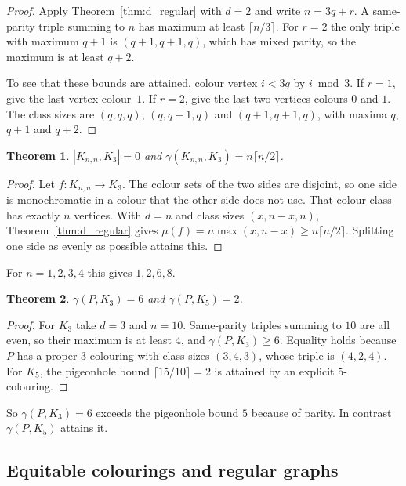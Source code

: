 \documentclass{article}
\newtheorem{theorem}{Theorem}[section]
\theoremstyle{definition}
\begin{document}
\begin{proof}
Apply Theorem~\ref{thm:d_regular} with $d=2$ and write $n=3q+r$.  A same-parity
triple summing to $n$ has maximum at least $\lceil n/3\rceil$.  For $r=2$ the
only triple with maximum $q+1$ is $(q+1,q+1,q)$, which has mixed parity, so the
maximum is at least $q+2$.

To see that these bounds are attained, colour vertex $i<3q$ by $i\bmod3$.  If
$r=1$, give the last vertex colour~$1$.  If $r=2$, give the last two vertices
colours $0$ and $1$.  The class sizes are $(q,q,q)$, $(q,q+1,q)$ and
$(q+1,q+1,q)$, with maxima $q$, $q+1$ and $q+2$.
\end{proof}

\begin{theorem}
\label{thm:Knn}
$|K_{n,n},K_3|=0$ and $\gamma(K_{n,n},K_3)=n\lceil n/2\rceil$.
\end{theorem}

\begin{proof}
Let $f\colon K_{n,n}\to K_3$.  The colour sets of the two sides are disjoint, so
one side is monochromatic in a colour that the other side does not use.  That
colour class has exactly $n$ vertices.  With $d=n$ and class sizes
$(x,n-x,n)$, Theorem~\ref{thm:d_regular} gives $\mu(f)=n\max(x,n-x)\ge
n\lceil n/2\rceil$.  Splitting one side as evenly as possible attains this.
\end{proof}

For $n=1,2,3,4$ this gives $1,2,6,8$.

\begin{theorem}
\label{thm:petersen_gamma}
$\gamma(P,K_3)=6$ and $\gamma(P,K_5)=2$.
\end{theorem}

\begin{proof}
For $K_3$ take $d=3$ and $n=10$.  Same-parity triples summing to $10$ are all
even, so their maximum is at least $4$, and $\gamma(P,K_3)\ge6$.  Equality holds
because $P$ has a proper $3$-colouring with class sizes $(3,4,3)$, whose triple is
$(4,2,4)$.  For $K_5$, the pigeonhole bound $\lceil15/10\rceil=2$ is attained by
an explicit $5$-colouring.
\end{proof}

So $\gamma(P,K_3)=6$ exceeds the pigeonhole bound $5$ because of parity.  In
contrast $\gamma(P,K_5)$ attains it.

\subsection{Equitable colourings and regular graphs}
\end{document}
